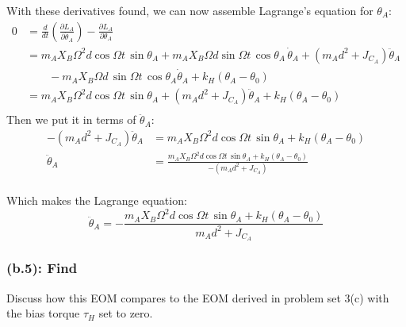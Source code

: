 \documentclass[titlepage]{article}
\begin{document}
With these derivatives found, we can now assemble Lagrange's equation for $\theta_A$:
\begin{equation}
	\begin{split}
		0&=\frac{d}{dt}\left(\frac{\partial L_A}{\partial\dot{\theta}_A}\right)-\frac{\partial L_A}{\partial\theta_A} \\
		&=m_AX_B\Omega^2d\cos\Omega t\,\sin\theta_A+m_AX_B\Omega d\sin\Omega t\,\cos\theta_A\,\dot{\theta}_A+\left(m_Ad^2+J_{C_A}\right)\ddot{\theta}_A \\
		&\qquad-m_AX_B\Omega d\,\sin\Omega t\,\cos\theta_A\dot{\theta}_A+k_H\left(\theta_A-\theta_0\right) \\
		&=m_AX_B\Omega^2d\cos\Omega t\,\sin\theta_A+\left(m_Ad^2+J_{C_A}\right)\ddot{\theta}_A+k_H\left(\theta_A-\theta_0\right) \\
	\end{split}
\end{equation}
Then we put it in terms of $\ddot{\theta}_A$:
\begin{equation}
	\begin{split}
		-\left(m_Ad^2+J_{C_A}\right)\ddot{\theta}_A&=m_AX_B\Omega^2d\cos\Omega t\,\sin\theta_A+k_H\left(\theta_A-\theta_0\right) \\
		\ddot{\theta}_A&=\frac{m_AX_B\Omega^2d\cos\Omega t\,\sin\theta_A+k_H\left(\theta_A-\theta_0\right) }{-\left(m_Ad^2+J_{C_A}\right)} \\
	\end{split}
\end{equation}

\begin{mdframed}[linewidth=1pt, innertopmargin=10pt, innerbottommargin=10pt]
	Which makes the Lagrange equation:
	\begin{equation}
		\ddot{\theta}_A=-\frac{m_AX_B\Omega^2d\cos\Omega t\,\sin\theta_A+k_H\left(\theta_A-\theta_0\right)}{m_Ad^2+J_{C_A}}
	\end{equation}
\end{mdframed}

\subsubsection*{(b.5): Find}
Discuss how this EOM compares to the EOM derived in problem set 3(c) with the bias torque $\tau_H$ set to zero.\\
\end{document}
